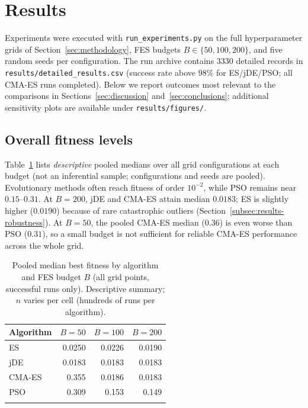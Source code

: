 \documentclass[pdflatex,sn-mathphys-num]{sn-jnl}
\begin{document}
\section{Results}\label{sec:results}

Experiments were executed with \texttt{run\_experiments.py} on the full hyperparameter grids of Section~\ref{sec:methodology}, FES budgets $B\in\{50,100,200\}$, and five random seeds per configuration.
The run archive contains $3330$ detailed records in \texttt{results/detailed\_results.csv} (success rate above $98\%$ for ES/jDE/PSO; all CMA-ES runs completed).
Below we report outcomes most relevant to the comparisons in Sections~\ref{sec:discussion} and~\ref{sec:conclusions}; additional sensitivity plots are available under \texttt{results/figures/}.

\subsection{Overall fitness levels}\label{subsec:results-overall}

Table~\ref{tab:fitness-pooled} lists \emph{descriptive} pooled medians over all grid configurations at each budget (not an inferential sample; configurations and seeds are pooled).
Evolutionary methods often reach fitness of order $10^{-2}$, while PSO remains near $0.15$--$0.31$.
At $B=200$, jDE and CMA-ES attain median $0.0183$; ES is slightly higher ($0.0190$) because of rare catastrophic outliers (Section~\ref{subsec:results-robustness}).
At $B=50$, the pooled CMA-ES median ($0.36$) is even worse than PSO ($0.31$), so a small budget is not sufficient for reliable CMA-ES performance across the whole grid.

\begin{table}[t]
\centering
\caption{Pooled median best fitness by algorithm and FES budget $B$ (all grid points, successful runs only). Descriptive summary; $n$ varies per cell (hundreds of runs per algorithm).}\label{tab:fitness-pooled}
\large
\setlength{\tabcolsep}{18pt}
\renewcommand{\arraystretch}{1.5}
\begin{tabular}{l r r r}
\toprule
Algorithm & $B=50$ & $B=100$ & $B=200$ \\
\midrule
ES        & 0.0250 & 0.0226 & 0.0190 \\
jDE       & 0.0183 & 0.0183 & 0.0183 \\
CMA-ES    & 0.355  & 0.0186 & 0.0183 \\
PSO       & 0.309  & 0.153  & 0.149  \\
\botrule
\end{tabular}
\normalsize
\end{table}
\end{document}
